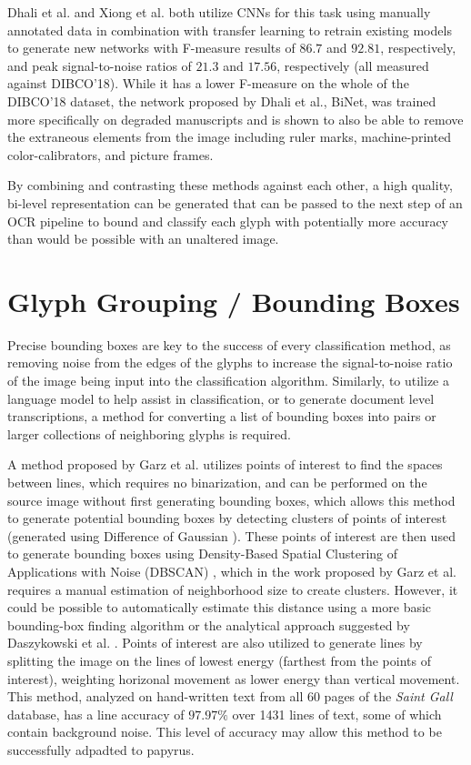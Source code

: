 Dhali et al.\cite{Dhali2019} and Xiong et al.\cite{Xiong} both utilize CNNs for this task using manually annotated data in combination with transfer learning to retrain existing models to generate new networks with F-measure results of $86.7$ and $92.81$, respectively, and peak signal-to-noise ratios of $21.3$ and $17.56$, respectively (all measured against DIBCO'18). While it has a lower F-measure on the whole of the DIBCO'18 dataset, the network proposed by Dhali et al., BiNet, was trained more specifically on degraded manuscripts and is shown to also be able to remove the extraneous elements from the image including ruler marks, machine-printed color-calibrators, and picture frames.

By combining and contrasting these methods against each other, a high quality, bi-level representation can be generated that can be passed to the next step of an OCR pipeline to bound and classify each glyph with potentially more accuracy than would be possible with an unaltered image.

\section{Glyph Grouping / Bounding Boxes}
Precise bounding boxes are key to the success of every classification method, as removing noise from the edges of the glyphs to increase the signal-to-noise ratio of the image being input into the classification algorithm. Similarly, to utilize a language model to help assist in classification, or to generate document level transcriptions, a method for converting a list of bounding boxes into pairs or larger collections of neighboring glyphs is required.

A method proposed by Garz et al.\cite{Garz2011, Garz2012} utilizes points of interest to find the spaces between lines, which requires no binarization, and can be performed on the source image without first generating bounding boxes, which allows this method to generate potential bounding boxes by detecting clusters of points of interest (generated using Difference of Gaussian \cite{Lowe}). These points of interest are then used to generate bounding boxes using Density-Based Spatial Clustering of Applications with Noise (DBSCAN) \cite{Ester}, which in the work proposed by Garz et al.\cite{Garz2011, Garz2012} requires a manual estimation of neighborhood size to create clusters. However, it could be possible to automatically estimate this distance using a more basic bounding-box finding algorithm or the analytical approach suggested by Daszykowski et al. \cite{Daszykowski}. Points of interest are also utilized to generate lines by splitting the image on the lines of lowest energy (farthest from the points of interest), weighting horizonal movement as lower energy than vertical movement.
This method, analyzed on hand-written text from all 60 pages of the \textit{Saint Gall} database, has a line accuracy of $97.97\%$ over 1431 lines of text, some of which contain background noise. This level of accuracy may allow this method to be successfully adpadted to papyrus.

